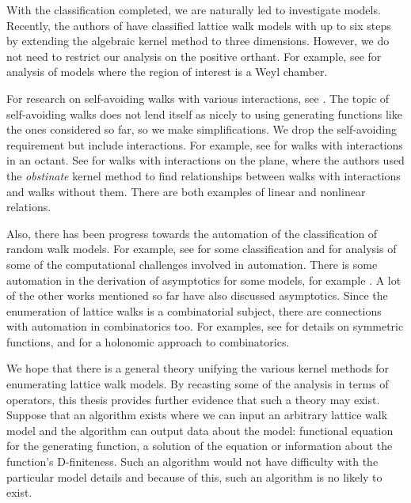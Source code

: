 With the classification completed, we are naturally led to investigate \highD models. Recently, the authors of \cite{bostan2014three} have classified lattice walk models with up to six steps by extending the algebraic kernel method to three dimensions. However, we do not need to restrict our analysis on the positive orthant. For example, see \cite{gessel1992random, grabiner1993random} for analysis of models where the region of interest is a Weyl chamber.

For research on self-avoiding walks with various interactions, see \cite{van2004multiple, brak2009self, wong2014confining, chan2012monte, bacher2011weakly, bedini2014lattice, dagrosa2015writhe}. The topic of self-avoiding walks does not lend itself as nicely to using generating functions like the ones considered so far, so we make simplifications. We drop the self-avoiding requirement but include interactions. For example, see \cite{niederhausen2005random, niederhausen2005note} for walks with interactions in an octant. See \cite{brak2005directed, owczarek2012enumeration, tabbara2014exact} for walks with interactions on the plane, where the authors used the \emph{obstinate} kernel method to find relationships between walks with interactions and walks without them. There are both examples of linear and nonlinear relations.

Also, there has been progress towards the automation of the classification of random walk models. For example, see \cite{bostan2009automatic} for  some classification and \cite{kauers2011computational} for analysis of some of the computational challenges involved in automation. There is some automation in the derivation of asymptotics for some models, for example \cite{melczer2014asymptotic, johnson2013towards, melczer2014enumerating, johnson2013analytic}. A lot of the other works mentioned so far have also discussed asymptotics. Since the enumeration of lattice walks is a combinatorial subject, there are connections with automation in combinatorics too. For examples, see \cite{gessel1990symmetric, chyzak2005effective} for details on symmetric functions, and \cite{mishna2005holonomic} for a holonomic approach to combinatorics.

We hope that there is a general theory unifying the various kernel methods for enumerating lattice walk models. By recasting some of the analysis in terms of operators, this thesis provides further evidence that such a theory may exist. Suppose that an algorithm exists where we can input an arbitrary lattice walk model and the algorithm can output data about the model: functional equation for the generating function, a solution of the equation or information about the function's D-finiteness. Such an algorithm would not have difficulty with the particular model details and because of this, such an algorithm is no likely to exist.

